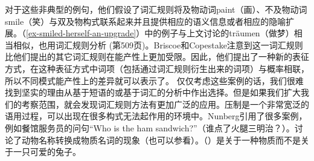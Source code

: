 \zl
对于这些非典型的例句，他们假设了词汇规则将及物动词paint（画）、不及物动词smile（笑）与双及物构式联系起来并且提供相应的语义信息或者相应的隐喻扩展。（\ref{ex-smiled-herself-an-upgrade}）中的例子与上文讨论的träumen（做梦）相当相似，也用词汇规则分析 (第509页)。Briscoe和Copestake注意到这一词汇规则比他们提出的其它词汇规则在能产性上更加受限。因此，他们提出了一种新的表征方式，在这种表征方式中词项（包括通过词汇规则衍生出来的词项）与概率相联，所以不同模式能产性上的差异就可以表示了。
    仅仅考虑这些案例的话，我们很难找到坚实的理由从基于短语的或基于词汇的分析中作出选择。但是如果我们扩大我们的考察范围，就会发现词汇规则方法有更加广泛的应用。压制是一个非常宽泛的语用过程，可以出现在很多构式无法起作用的环境中\citep{Nunberg95a-u}。Nunberg引用了很多案例，例如餐馆服务员的问句“Who is the ham sandwich?”（谁点了火腿三明治？）\citep[]{Nunberg95a-u}。\citet[]{CB92a}讨论了动物名称转换成物质名词的现象（也可以参看\citet[--43]{CB95a-u}）。（）是关于一种物质而不是关于一只可爱的兔子。
